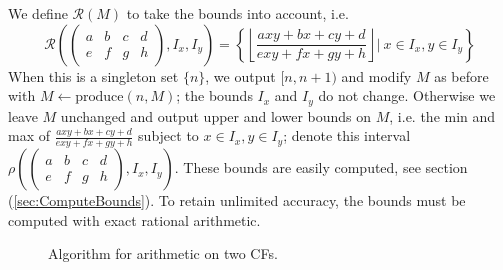 \documentclass[11pt, oneside]{amsart}   	%
\newcommand{\bihom}[8]{{\frac{#1 xy + #2 x + #3 y + #4}{#5 xy + #6 x + #7 y + #8}}}
\newcommand{\abcd}{\left(
\begin{smallmatrix} 
a & b & c & d\\ 
e & f & g & h
\end{smallmatrix}
\right)}
\begin{document}
We define $\mathcal{R}(M)$ to take the bounds into account, i.e.
\begin{equation}
\mathcal{R}\left(\abcd, I_x, I_y\right) = \left\{ \left\lfloor \bihom{a}{b}{c}{d}{e}{f}{g}{h} \right\rfloor | \  x \in I_x, y \in I_y \right\}
\end{equation}
When this is a singleton set $\{n\}$, we output $[n,n+1)$ and modify $M$ as before with $M \leftarrow \mbox{produce}(n,M)$; the bounds $I_x$ and $I_y$ do not change. Otherwise we leave $M$ unchanged and output upper and lower bounds on $M$, i.e. the min and max of $\bihom{a}{b}{c}{d}{e}{f}{g}{h}$ subject to $x \in I_x, y \in I_y$; denote this interval $\rho\left(\abcd, I_x, I_y\right)$. These bounds are easily computed, see section (\ref{sec:ComputeBounds}). To retain unlimited accuracy, the bounds must be computed with exact rational arithmetic.



\begin{figure}
\begin{algorithmic}\label{fig:twoCFarith}
\STATE{}
\STATE{}
\STATE{}
 
 
 
    \STATE{}
     \ELSE
         \STATE{$I_x \gets [1,\infty)$}
     \ENDIF
     \ELSE
         \STATE{$I_y \gets [1,\infty)$}
     \ENDIF
     
     \STATE{}
     \ELSE
     \ENDIF
\ENDWHILE
\end{algorithmic}
\caption{Algorithm for arithmetic on two CFs.}
\end{figure}
\end{document}
